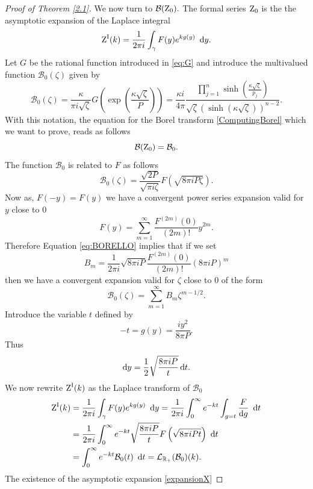 \begin{proof}[Proof of Theorem \ref{2.1}]
We now turn to $\mathcal{B}(\operatorname{Z}_{0}).$ The formal series $\operatorname{Z}_{0}$ is the   the asymptotic expansion of the Laplace integral $$\operatorname{Z}^{\operatorname{I}}(k)=\frac{1}{2\pi i} \int_{\gamma} F(y) e^{kg(y)} \ \operatorname{{d}\hskip-.6mm} y.$$ Let $G$ be the rational function introduced in \eqref{eq:G} and introduce the multivalued function $\mathcal{B}_0(\zeta)$ given by 
\begin{equation}
\mathcal{B}_0(\zeta)= \frac{\kappa}{\pi i \sqrt{\zeta}} G\left( \exp\left(\frac{\kappa\sqrt{\zeta}}{P} \right)\right)= \frac{\kappa i}{4\pi } \frac{\prod_{j=1}^n \sinh\left(\frac{\kappa\sqrt{\zeta}}{p_j}\right)}{ \sqrt{\zeta} \left(\sinh\left(\kappa\sqrt{\zeta}\right)\right)^{n-2}}.
\end{equation} With this notation, the equation for the Borel transform  \eqref{ComputingBorel} which we want to prove, reads as follows
\begin{equation} \label{eq:reduction}
\mathcal{B}(\operatorname{Z}_0)= \mathcal{B}_0. 
\end{equation} The function $\mathcal{B}_0$ is related to $F$ as follows
\begin{equation} \label{eq:BORELLO}
\mathcal{B}_0(\zeta)=\frac{\sqrt{ 2 P }}{ \sqrt{\pi i\zeta}} F\left(\sqrt{8\pi i P \zeta}\right).
\end{equation} 
 Now as, $F(-y)=F(y)$ we have a convergent power series expansion valid for $y$ close to $0$
$$F(y)=\sum_{m=1}^{\infty} \frac{F^{(2m)}(0)}{(2m)!} y^{2m}.$$
Therefore Equation \eqref{eq:BORELLO} implies that if we set $$B_m=  \frac{1}{2 \pi i} \sqrt{8\pi i P} \frac{F^{(2m)}(0)}{(2m)!}  \left(8\pi i P \right)^{m}$$ then we have a convergent expansion valid for $\zeta$ close to $0$ of the form
\begin{equation} \label{eq:zetanearzero}
\mathcal{B}_0(\zeta) = \sum_{m=1}^{\infty}  B_m \zeta^{m-1/2}.
\end{equation}
  Introduce the variable $t$ defined by 
  $$-t=g(y)= \frac{ i y^2}{8 \pi P}.$$ 
  Thus 
  $$ \operatorname{{d}\hskip-.6mm} y= \frac12 \sqrt{\frac{8 \pi i P }{  t}} \operatorname{{d}\hskip-.6mm} t.$$ 
  We now rewrite $\operatorname{Z}^{\operatorname{I}}(k)$ as the Laplace transform of $\mathcal{B}_0$ 
\begin{align} \label{ComputeBorel} \begin{split}
\operatorname{Z}^{\operatorname{I}}(k)&= \frac{1}{2 \pi i} \int_\gamma F(y) e^{kg(y)} \ \operatorname{{d}\hskip-.6mm} y =  \frac{1}{2 \pi i} \int_0^{\infty} e^{-kt} \int_{g=t} \frac{F}{\operatorname{{d}\hskip-.6mm} g} \ \operatorname{{d}\hskip-.6mm} t
\\ &= \frac{1}{2 \pi i} \int_0^{\infty} e^{-kt} \sqrt{\frac{8 \pi i P}{ t}} F\left(\sqrt{8\pi i Pt}\right) \ \operatorname{{d}\hskip-.6mm} t
\\ &= \int_0^{\infty} e^{-kt} \mathcal{B}_0(t) \ \operatorname{{d}\hskip-.6mm} t = \mathcal{L}_{\mathbb{R}_+} (\mathcal{B}_0)(k).
 \end{split}
\end{align}
  The existence of the asymptotic expansion \eqref{expansionX}
  

\end{proof}
